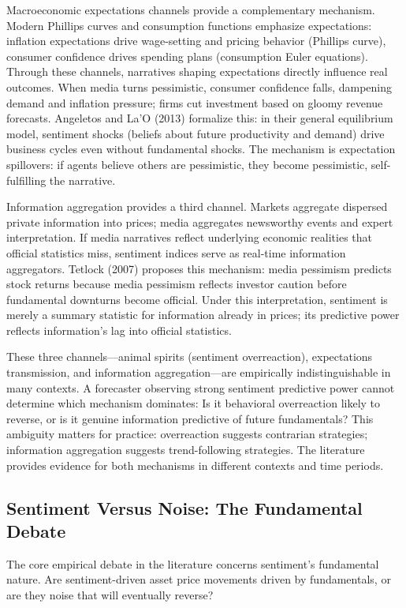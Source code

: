\documentclass[11pt]{article}
\begin{document}
Macroeconomic expectations channels provide a complementary mechanism. Modern Phillips curves and consumption functions emphasize expectations: inflation expectations drive wage-setting and pricing behavior (Phillips curve), consumer confidence drives spending plans (consumption Euler equations). Through these channels, narratives shaping expectations directly influence real outcomes. When media turns pessimistic, consumer confidence falls, dampening demand and inflation pressure; firms cut investment based on gloomy revenue forecasts. Angeletos and La'O (2013) formalize this: in their general equilibrium model, sentiment shocks (beliefs about future productivity and demand) drive business cycles even without fundamental shocks. The mechanism is expectation spillovers: if agents believe others are pessimistic, they become pessimistic, self-fulfilling the narrative.

Information aggregation provides a third channel. Markets aggregate dispersed private information into prices; media aggregates newsworthy events and expert interpretation. If media narratives reflect underlying economic realities that official statistics miss, sentiment indices serve as real-time information aggregators. Tetlock (2007) proposes this mechanism: media pessimism predicts stock returns because media pessimism reflects investor caution before fundamental downturns become official. Under this interpretation, sentiment is merely a summary statistic for information already in prices; its predictive power reflects information's lag into official statistics.

These three channels---animal spirits (sentiment overreaction), expectations transmission, and information aggregation---are empirically indistinguishable in many contexts. A forecaster observing strong sentiment predictive power cannot determine which mechanism dominates: Is it behavioral overreaction likely to reverse, or is it genuine information predictive of future fundamentals? This ambiguity matters for practice: overreaction suggests contrarian strategies; information aggregation suggests trend-following strategies. The literature provides evidence for both mechanisms in different contexts and time periods.

\subsection{Sentiment Versus Noise: The Fundamental Debate}

The core empirical debate in the literature concerns sentiment's fundamental nature. Are sentiment-driven asset price movements driven by fundamentals, or are they noise that will eventually reverse?
\end{document}
